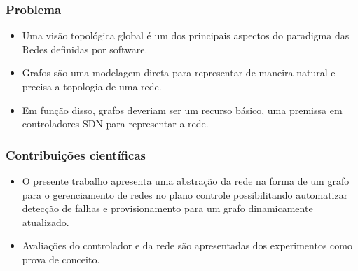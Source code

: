 %
%
\begin{frame}\frametitle{Problema}
    \begin{itemize}
        \setlength{\itemsep}{1cm}
        \item Uma visão topológica global é um dos principais aspectos do 
              paradigma das Redes definidas por software.
        \item Grafos são uma modelagem direta para representar de maneira 
              natural e precisa a topologia de uma rede.
        \item Em função disso, grafos deveriam ser um recurso básico, 
              uma premissa em controladores SDN para representar a rede.
    \end{itemize} 
\end{frame}


%
%
\begin{frame}\frametitle{Contribuições científicas}
    \begin{itemize}
        \setlength{\itemsep}{1cm}
        \item O presente trabalho apresenta uma abstração da rede na forma 
              de um grafo para o gerenciamento de redes no plano controle 
              possibilitando automatizar detecção de falhas e 
              provisionamento para um grafo dinamicamente atualizado.
        \item Avaliações do controlador e da rede são apresentadas dos
              experimentos como prova de conceito.

    \end{itemize}
\end{frame}


%
%
% 
